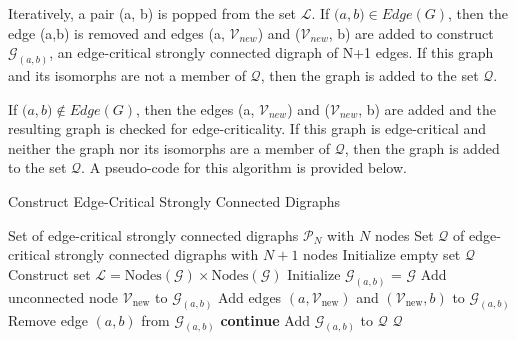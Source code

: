 \documentclass[runningheads]{llncs}
\begin{document}
Iteratively, a pair (a, b) is popped from the set $\mathcal{L}$. If $\mathcal (a,b) \in Edge({G})$, then the edge (a,b) is removed and edges (a, $\mathcal{V}_{new}$) and ($\mathcal{V}_{new}$, b) are added to construct $\mathcal{G}_{(a, b)}$, an edge-critical strongly connected digraph of N+1 edges. If this graph and its isomorphs are not a member of $\mathcal{Q}$, then the graph is added to the set $\mathcal{Q}$.

If $\mathcal (a,b) \notin Edge({G})$, then the edges (a, $\mathcal{V}_{new}$) and ($\mathcal{V}_{new}$, b) are added and the resulting graph is checked for edge-criticality. If this graph is edge-critical and neither the graph nor its isomorphs are a member of $\mathcal{Q}$, then the graph is added to the set $\mathcal{Q}$. A pseudo-code for this algorithm is provided below.


\begin{algorithm}
\caption{Construct Edge-Critical Strongly Connected Digraphs}
\begin{algorithmic}[1]
\REQUIRE Set of edge-critical strongly connected digraphs $\mathcal{P}_N$ with $N$ nodes
\ENSURE Set $\mathcal{Q}$ of edge-critical strongly connected digraphs with $N+1$ nodes
\STATE Initialize empty set $\mathcal{Q}$
    \STATE Construct set $\mathcal{L} = \text{Nodes}(\mathcal{G}) \times \text{Nodes}(\mathcal{G})$
        \STATE Initialize $\mathcal{G}_{(a, b)}$ = $\mathcal{G}$
        \STATE Add unconnected node $\mathcal{V}_{\text{new}}$ to $\mathcal{G}_{(a, b)}$
        \STATE Add edges $(a, \mathcal{V}_{\text{new}})$ and $(\mathcal{V}_{\text{new}}, b)$  to $\mathcal{G}_{(a, b)}$
            \STATE Remove edge $(a, b)$ from $\mathcal{G}_{(a, b)}$
        \ELSE
                \STATE \textbf{continue}
            \ENDIF
        \ENDIF
            \STATE Add $\mathcal{G}_{(a, b)}$ to $\mathcal{Q}$
        \ENDIF
    \ENDFOR
\ENDFOR
\RETURN $\mathcal{Q}$
\end{algorithmic}
\end{algorithm}
\end{document}
